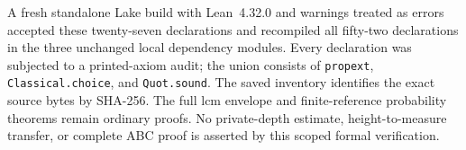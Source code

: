 A fresh standalone Lake build with Lean~4.32.0 and warnings treated as
errors accepted these twenty-seven declarations and recompiled all fifty-two
declarations in the three unchanged local dependency modules.  Every
declaration was subjected to a printed-axiom audit; the union consists of
\texttt{propext}, \texttt{Classical.choice}, and \texttt{Quot.sound}.
The saved inventory identifies the exact source bytes by SHA-256.
The full lcm envelope and finite-reference probability theorems remain
ordinary proofs.  No private-depth estimate, height-to-measure transfer,
or complete ABC proof is asserted by this scoped formal verification.

